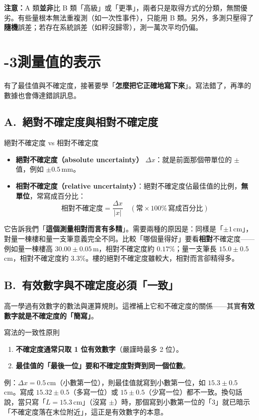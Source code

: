 \documentclass[11pt]{article}
\begin{document}
\textbf{注意：}A 類\textbf{並非}比 B 類「高級」或「更準」，兩者只是取得方式的分類，無關優劣。有些量根本無法重複測（如一次性事件），只能用 B 類。另外，多測只壓得了\textbf{隨機}誤差；若存在系統誤差（如秤沒歸零），測一萬次平均仍偏。

\section*{-3\quad 測量值的表示}

有了最佳值與不確定度，接著要學「\textbf{怎麼把它正確地寫下來}」。寫法錯了，再準的數據也會傳達錯誤訊息。

\subsection*{\sffamily A.\ 絕對不確定度與相對不確定度}

\begin{補充框}{絕對不確定度 vs 相對不確定度}
\begin{itemize}\setlength{\itemsep}{2pt}
\item \textbf{絕對不確定度（absolute uncertainty）} $\Delta x$：就是前面那個帶單位的 $\pm$ 值，例如 $\pm 0.5$\,mm。
\item \textbf{相對不確定度（relative uncertainty）}：絕對不確定度佔最佳值的比例，\textbf{無單位}，常寫成百分比：
$$\boxed{\ \text{相對不確定度} = \frac{\Delta x}{|x|}\quad(\text{常}\times 100\%\,\text{寫成百分比})\ }$$
\end{itemize}
它告訴我們「\textbf{這個測量相對而言有多精}」。需要兩種的原因是：同樣是「$\pm 1$\,cm」，對量一棟樓和量一支筆意義完全不同。比較「哪個量得好」要看\textbf{相對}不確定度——例如量一棟樓高 $30.00\pm0.05$\,m，相對不確定度約 $0.17\%$；量一支筆長 $15.0\pm0.5$\,cm，相對不確定度約 $3.3\%$。樓的絕對不確定度雖較大，相對而言卻精得多。
\end{補充框}

\subsection*{\sffamily B.\ 有效數字與不確定度必須「一致」}

高一學過有效數字的數法與運算規則。這裡補上它和不確定度的關係——其實\textbf{有效數字就是不確定度的「簡寫」}。

\begin{補充框}{寫法的一致性原則}
\begin{enumerate}\setlength{\itemsep}{2pt}
\item \textbf{不確定度通常只取 1 位有效數字}（嚴謹時最多 2 位）。
\item \textbf{最佳值的「最後一位」要和不確定度對齊到同一個位數}。
\end{enumerate}
例：$\Delta x = 0.5$\,cm（小數第一位），則最佳值就寫到小數第一位，如 $15.3 \pm 0.5$\,cm。寫成 $15.32 \pm 0.5$（多寫一位）或 $15 \pm 0.5$（少寫一位）都不一致。換句話說，當只寫「$L=15.3$\,cm」（沒寫 $\pm$）時，那個寫到小數第一位的「3」就已暗示「不確定度落在末位附近」，這正是有效數字的本意。
\end{補充框}
\end{document}
